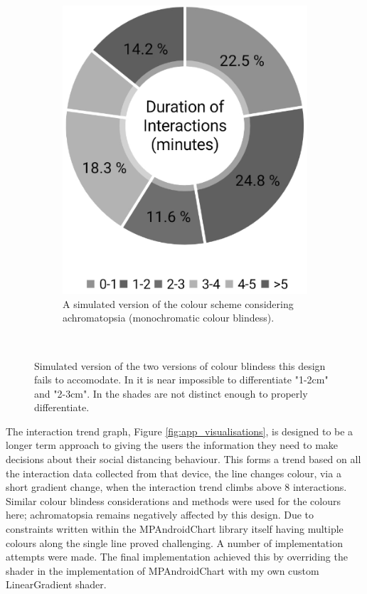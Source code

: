 \documentclass{l4proj}
\begin{document}
\begin{figure}[!htb]
\begin{subfigure}[b]{0.3\textwidth}
        \includegraphics[width=\textwidth]{images/achromatopsia.png}
        \caption{ A simulated version of the colour scheme considering achromatopsia (monochromatic colour blindess). }
        \label{fig:achromatopsia}
    \end{subfigure}
    ~
    \caption{ Simulated version of the two versions of colour blindess this design fails to accomodate. In  it is near impossible to differentiate "1-2cm" and "2-3cm". In  the shades are not distinct enough to properly differentiate. }
    \label{fig:colour_blindess}
\end{figure}

The interaction trend graph, Figure \ref{fig:app_visualisations}, is designed to be a longer term approach to giving the users the information they need to make decisions about their social distancing behaviour. This forms a trend based on all the interaction data collected from that device, the line changes colour, via a short gradient change, when the interaction trend climbs above 8 interactions. Similar colour blindess considerations and methods were used for the colours here; achromatopsia remains negatively affected by this design. Due to constraints written within the MPAndroidChart library itself having multiple colours along the single line proved challenging. A number of implementation attempts were made. The final implementation achieved this by overriding the shader in the implementation of MPAndroidChart with my own custom LinearGradient shader.
\end{document}

